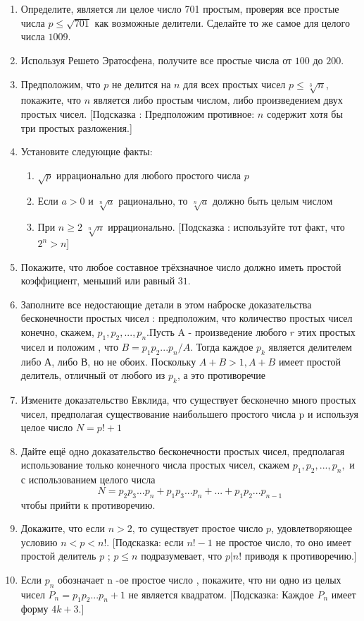 \documentclass[11pt]{article}
\begin{document}
\section*{}
\begin{enumerate}
	\item Определите, является ли целое число 701 простым, проверяя все простые числа $p \leq \sqrt{701}$ как возможные делители. Сделайте то же самое для целого числа $1009$.
	\item Используя Решето Эратосфена, получите все простые числа от $100$ до $200$.
	\item Предположим, что $p$ не делится на $n$ для всех простых чисел $p \leq \sqrt[3]{n}$, покажите, что $n$ является либо простым числом, либо произведением двух простых чисел. [Подсказка : Предположим противное: $n$ содержит хотя бы три простых разложения.]
	\item Установите следующие факты:
	\begin{enumerate}
		\item $\sqrt{p}$ иррационально для любого простого числа $p$
			\item Если $a > 0$ и $\sqrt[n]{a}$ рационально, то $\sqrt[n]{a}$ должно быть целым числом
				\item При $n \geq 2$ $\sqrt[n]{n}$ иррационально. [Подсказка : используйте тот факт, что $2^{n}>n$]
	\end{enumerate}
\item Покажите, что любое составное трёхзначное число должно иметь простой коэффициент, меньший или равный $31$.
\item Заполните все недостающие детали в этом наброске доказательства бесконечности простых чисел : предположим, что количество простых чисел конечно, скажем, $p_{1},p_{2},...,p_{n}$.Пусть A - произведение любого $r$ этих простых чисел и положим , что $B =p_{1}p_{2}...p_{n}/A$. Тогда каждое $p_{k}$ является делителем либо А, либо В, но не обоих. Поскольку $A+B > 1, A+B$ имеет простой делитель, отличный от любого из $p_{k}$, а это противоречие
\item Измените доказательство Евклида, что существует бесконечно много простых чисел, предполагая существование наибольшего простого числа p и используя целое число ${N = p!+ 1}$
\item Дайте ещё одно доказательство бесконечности простых чисел, предполагая использование только конечного числа простых чисел, скажем ${p_{1},p_{2},...,p_{n},}$ и с использованием целого числа \[N = p_2p_3...p_n + p_1p_3...p_n +...+ p_1p_2...p_{n-1}\]чтобы прийти к противоречию.
\item Докажите, что если $n > 2$, то существует простое число $p$, удовлетворяющее условию $n < p < n!$. [Подсказка: если $n! - 1$ не простое число, то оно имеет простой делитель $p$ ; $p \leq n$ подразумевает, что $p | n!$ приводя к противоречию.]
\item Если $p_n$ обозначает n -ое простое число , покажите, что ни одно из целых чисел ${P_n = p_{1}p_{2}...p_{n}+1}$ не является квадратом. [Подсказка: Каждое $P_n$ имеет форму $4k + 3$.]
\end{enumerate}
\thispagestyle{fancy}
\rhead{\thepage}
\end{document}
